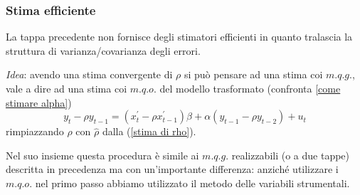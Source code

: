 \documentclass[a4paper]{report}
\theoremstyle{remark}
\begin{document}
\subsubsection{Stima efficiente}

La tappa precedente non fornisce degli stimatori efficienti in quanto
tralascia la struttura di varianza/covarianza degli errori.

\noindent \emph{Idea}: avendo una stima convergente di $\rho $ si pu\`{o}
pensare ad una stima coi $m.q.g.$, vale a dire ad una stima coi $m.q.o.$ del
modello trasformato (confronta \ref{come stimare alpha})%
\begin{equation}
y_{t}-\rho y_{t-1}=(x_{t}^{\prime }-\rho x_{t-1}^{\prime })\beta +\alpha
(y_{t-1}-\rho y_{t-2})+u_{t}
\label{modello trasformato per efficienza asintotica}
\end{equation}%
rimpiazzando $\rho $ con $\widehat{\rho }$ dalla (\ref{stima di rho}).

\noindent Nel suo insieme questa procedura \`{e} simile ai $m.q.g.$
realizzabili (o a due tappe) descritta in precedenza ma con un'importante
differenza: anzich\'{e} utilizzare i $m.q.o.$ nel primo passo abbiamo
utilizzato il metodo delle variabili strumentali.
\end{document}
